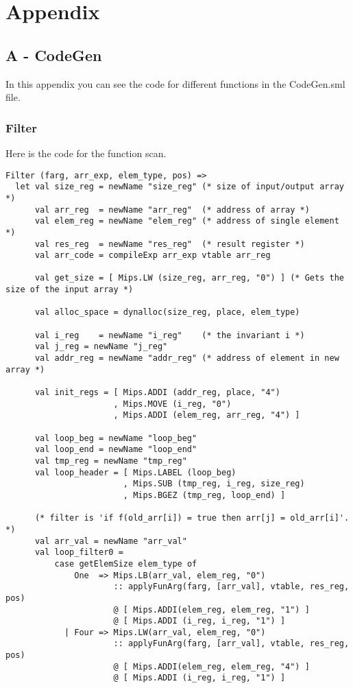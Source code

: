 \documentclass[12pt]{article}
\begin{document}
\section{Appendix}
\subsection{A - CodeGen}
In this appendix you can see the code for different functions in the CodeGen.sml file.

\subsubsection{Filter}
Here is the code for the function scan. 

\begin{verbatim}
Filter (farg, arr_exp, elem_type, pos) =>
  let val size_reg = newName "size_reg" (* size of input/output array *)
      val arr_reg  = newName "arr_reg"  (* address of array *)
      val elem_reg = newName "elem_reg" (* address of single element *)
      val res_reg  = newName "res_reg"  (* result register *)
      val arr_code = compileExp arr_exp vtable arr_reg

      val get_size = [ Mips.LW (size_reg, arr_reg, "0") ] (* Gets the size of the input array *)
      
      val alloc_space = dynalloc(size_reg, place, elem_type)

      val i_reg    = newName "i_reg"    (* the invariant i *)
      val j_reg = newName "j_reg"
      val addr_reg = newName "addr_reg" (* address of element in new array *)

      val init_regs = [ Mips.ADDI (addr_reg, place, "4")
                      , Mips.MOVE (i_reg, "0")
                      , Mips.ADDI (elem_reg, arr_reg, "4") ]

      val loop_beg = newName "loop_beg"
      val loop_end = newName "loop_end"
      val tmp_reg = newName "tmp_reg"
      val loop_header = [ Mips.LABEL (loop_beg)
                        , Mips.SUB (tmp_reg, i_reg, size_reg)
                        , Mips.BGEZ (tmp_reg, loop_end) ]

      (* filter is 'if f(old_arr[i]) = true then arr[j] = old_arr[i]'. *)
      val arr_val = newName "arr_val"
      val loop_filter0 =
          case getElemSize elem_type of
              One  => Mips.LB(arr_val, elem_reg, "0")
                      :: applyFunArg(farg, [arr_val], vtable, res_reg, pos)
                      @ [ Mips.ADDI(elem_reg, elem_reg, "1") ]
                      @ [ Mips.ADDI (i_reg, i_reg, "1") ]
            | Four => Mips.LW(arr_val, elem_reg, "0")
                      :: applyFunArg(farg, [arr_val], vtable, res_reg, pos)
                      @ [ Mips.ADDI(elem_reg, elem_reg, "4") ]
                      @ [ Mips.ADDI (i_reg, i_reg, "1") ]


\end{verbatim}
\end{document}
